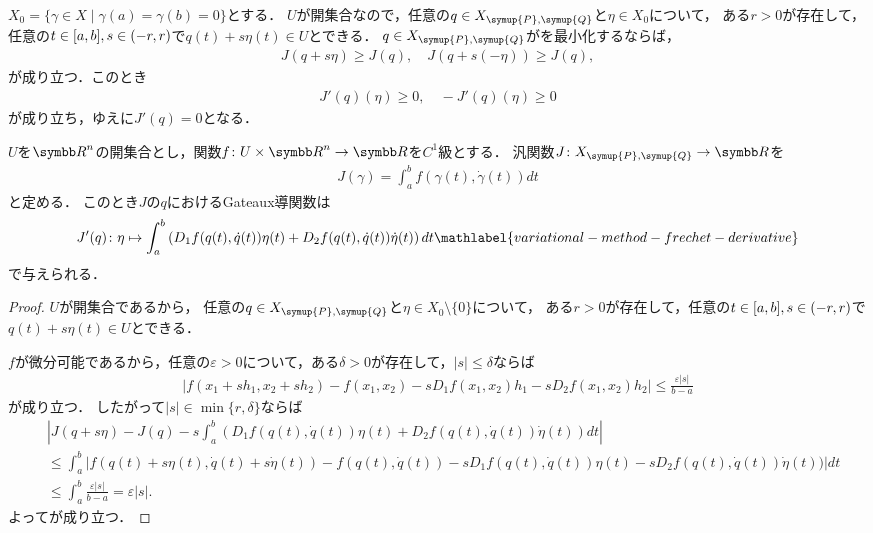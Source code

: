 \documentclass{ltjsarticle}
\begin{document}
\(X_0 = \{\gamma \in X \mid \gamma(a) = \gamma(b) = 0\}\)とする．
\(U\)が開集合なので，任意の\(q \in X_{\symup{P}, \symup{Q}}\)と\(\eta \in X_0\)について，
ある\(r > 0\)が存在して，任意の\(t \in [a, b], s \in (-r, r)\)で\(q(t) + s \eta(t) \in U\)とできる．
\(q \in X_{\symup{P}, \symup{Q}}\)がを最小化するならば，
\begin{align*}
    J(q + s \eta) \geq J(q), \quad J(q + s (- \eta)) \geq J(q),
\end{align*}
が成り立つ．このとき
\begin{align*}
    J' (q)(\eta) \geq 0, \quad - J'(q)(\eta) \geq 0
\end{align*}
が成り立ち，ゆえに\(J'(q) = 0\)となる．

\begin{thmbox}
\begin{proposition}
\(U\)を\({\Real}^n\)の開集合とし，関数\(f \colon U \times {\Real}^n \to {\Real}\)を\(C^1\)級とする．
汎関数\(J \colon X_{\symup{P}, \symup{Q}} \to {\Real}\)を
\begin{align*}
    J(\gamma) = \int_a^b f(\gamma(t), \dot{\gamma}(t)) dt
\end{align*}
と定める．
このとき\(J\)の\(q\)におけるGateaux導関数は
\begin{align}
    J' (q) \colon \eta \mapsto \int_a^b \left( D_1 f(q(t), \dot{q}(t)) \eta(t)  + D_2 f(q(t), \dot{q}(t)) \dot{\eta}(t) \right) dt \mathlabel{variational-method-frechet-derivative}
\end{align}
で与えられる．
\end{proposition}
\end{thmbox}

\begin{proof}
\(U\)が開集合であるから，
任意の\(q \in X_{\symup{P}, \symup{Q}}\)と\(\eta \in X_0 \setminus \{0\}\)について，
ある\(r > 0\)が存在して，任意の\(t \in [a, b], s \in (-r, r)\)で\(q(t) + s \eta(t) \in U\)とできる．

\(f\)が微分可能であるから，任意の\(\varepsilon > 0\)について，ある\(\delta > 0\)が存在して，\(\lvert s \rvert \leq \delta\)ならば
\begin{align*}
    \lvert f(x_1 + s h_1, x_2 + s h_2) - f(x_1, x_2) - s D_1 f(x_1, x_2) h_1
    - s D_2 f (x_1, x_2) h_2  \rvert \leq \frac{\varepsilon \lvert s \rvert}{b - a}
\end{align*}
が成り立つ．
したがって\(\lvert s \rvert \in \min \{r, \delta\}\)ならば
\begin{align*}
    &\left\lvert J(q + s \eta) - J(q) - s \int_a^b  (D_1 f(q(t), \dot{q}(t)) \eta(t) + D_2 f (q(t), \dot{q}(t)) \dot{\eta}(t))  dt \right\rvert \\
    &\leq \int_a^b \left\lvert f(q(t) + s \eta(t), \dot{q}(t) + s \dot{\eta}(t)) - f(q(t), \dot{q}(t))
    - s D_1 f(q(t), \dot{q}(t)) \eta(t) - s D_2 f (q(t), \dot{q}(t)) \dot{\eta}(t)) \right\rvert dt \\
    &\leq \int_a^b \frac{\varepsilon \lvert s \rvert}{b - a} = \varepsilon \lvert s \rvert.
\end{align*}
よってが成り立つ．
\end{proof}
\end{document}
